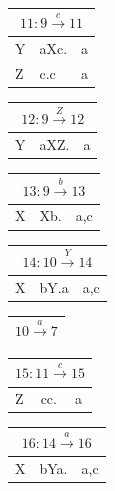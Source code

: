 \documentclass[11pt]{scrartcl}
\begin{document}
	\begin{table}[!htbp]
		\begin{tabular}[t]{l|l|l}
				\multicolumn{3}{c}{$11: 9 \xrightarrow{c} 11$} \\ \hline
				Y & aXc. & a \\ \hline
				Z & c.c & a
		\end{tabular}
		\begin{tabular}[t]{l|l|l}
			\multicolumn{3}{c}{$12: 9 \xrightarrow{Z} 12$} \\ \hline
			Y & aXZ. & a \\
		\end{tabular}
		\begin{tabular}[t]{l|l|l}
			\multicolumn{3}{c}{$13: 9 \xrightarrow{b} 13$} \\ \hline
			X & Xb. & a,c \\
		\end{tabular}
		\begin{tabular}[t]{l|l|l}
				\multicolumn{3}{c}{$14: 10 \xrightarrow{Y} 14$} \\ \hline
			X & bY.a & a,c \\
		\end{tabular}
		\begin{tabular}[t]{l}
				$10 \xrightarrow{a} 7$ \\ \hline
		\end{tabular}
	\end{table}
		
		\begin{table}[!htbp]
			\begin{tabular}[t]{l|l|l}
				\multicolumn{3}{c}{$15: 11 \xrightarrow{c} 15$} \\ \hline
				Z & cc. & a \\ 
			\end{tabular}
			\begin{tabular}[t]{l|l|l}
				\multicolumn{3}{c}{$16: 14 \xrightarrow{a} 16$} \\ \hline
				X & bYa. & a,c \\
			\end{tabular}
		\end{table}
	
\end{document}
